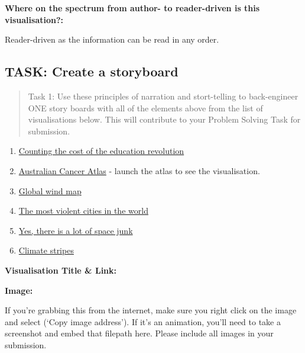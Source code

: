 \documentclass[]{article}
\providecommand{\tightlist}{%
  \setlength{\itemsep}{0pt}\setlength{\parskip}{0pt}}
\begin{document}
\textbf{Where on the spectrum from author- to reader-driven is this
visualisation?:}

 Reader-driven as the information can be read in any order.

\subsection{TASK: Create a storyboard}\label{task-create-a-storyboard}

\begin{quote}
Task 1: Use these principles of narration and stort-telling to
back-engineer ONE story boards with all of the elements above from the
list of visualisations below. This will contribute to your Problem
Solving Task for submission.
\end{quote}

\begin{enumerate}
\def\labelenumi{\arabic{enumi}.}
\tightlist
\item
  \href{https://www.abc.net.au/news/2018-11-22/counting-the-cost-of-the-education-revolution/10495756}{Counting
  the cost of the education revolution}
\item
  \href{https://atlas.cancer.org.au/}{Australian Cancer Atlas} - launch
  the atlas to see the visualisation.\\
\item
  \href{https://earth.nullschool.net/\#current/wind/isobaric/1000hPa/orthographic=25.77,0.41,440}{Global
  wind map}\\
\item
  \href{https://www.behance.net/gallery/70033395/The-Most-Violent-Cities/}{The
  most violent cities in the world}\\
\item
  \href{https://www.axios.com/yes-there-really-is-a-lot-of-space-junk-930b166d-68c4-4803-9bd6-9e23514eb942.html}{Yes,
  there is a lot of space junk}\\
\item
  \href{https://showyourstripes.info/}{Climate stripes}
\end{enumerate}

\textbf{Visualisation Title \& Link:}

\textbf{Image:}

If you're grabbing this from the internet, make sure you right click on
the image and select (`Copy image address'). If it's an animation,
you'll need to take a screenshot and embed that filepath here. Please
include all images in your submission.
\end{document}
